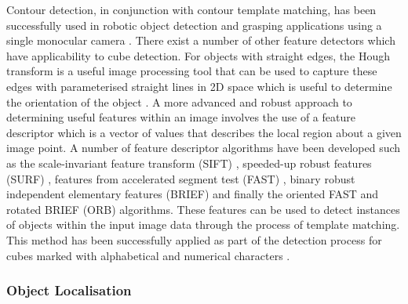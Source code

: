 Contour detection, in conjunction with contour template matching, has been successfully used in robotic object detection and grasping applications using a single monocular camera \cite{Wei:Robotic_Object_Recognition_With_Natural_Background}. There exist a number of other feature detectors which have applicability to cube detection. For objects with straight edges, the Hough transform is a useful image processing tool that can be used to capture these edges with parameterised straight lines in 2D space which is useful to determine the orientation of the object \cite{Aggarwal:Line_Detection_Hough_Transform}. A more advanced and robust approach to determining useful features within an image involves the use of a feature descriptor which is a vector of values that describes the local region about a given image point. A number of feature descriptor algorithms have been developed such as the scale-invariant feature transform (SIFT) \cite{Lowe:Distinctive_Image_Features_from_Scale_Invariant_Keypoints}, speeded-up robust features (SURF) \cite{Bay:SURF_Speeded_Up_Robust_Features}, features from accelerated segment test (FAST) \cite{Rosten:Machine_Learning_for_High_Speed_Corner_Detection}, binary robust independent elementary features (BRIEF) \cite{Calonder:BRIEF_Binary_Robust_Independent_Elementary_Features} and finally the oriented FAST and rotated BRIEF (ORB) \cite{Rublee:ORB_Alternative_to_SIFT_or_SURF} algorithms. These features can be used to detect instances of objects within the input image data through the process of template matching. This method has been successfully applied as part of the detection process for cubes marked with alphabetical and numerical characters \cite{Lin:Character_Cube_Stacking_Robot}.


\subsubsection{Object Localisation}

